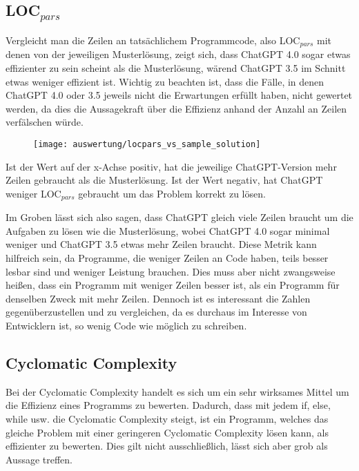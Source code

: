\documentclass[class=scrbook, crop=false]{standalone}
\begin{document}
    \subsection{LOC$_{pars}$}
    Vergleicht man die Zeilen an tatsächlichem Programmcode, also LOC$_{pars}$ mit denen von der jeweiligen Musterlösung,
    zeigt sich, dass ChatGPT 4.0 sogar etwas effizienter zu sein scheint als die Musterlösung, wärend ChatGPT 3.5 im Schnitt etwas weniger effizient ist.
    Wichtig zu beachten ist, dass die Fälle, in denen ChatGPT 4.0 oder 3.5 jeweils nicht die Erwartungen erfüllt haben, nicht
    gewertet werden, da dies die Aussagekraft über die Effizienz anhand der Anzahl an Zeilen verfälschen würde.
    \begin{figure}[H]
        \centering
        \texttt{[image: auswertung/locpars\_vs\_sample\_solution]}
        \caption{}
        \label{fig:3}
    \end{figure}
    Ist der Wert auf der x-Achse positiv, hat die jeweilige ChatGPT-Version mehr Zeilen gebraucht als die Musterlösung.
    Ist der Wert negativ, hat ChatGPT weniger LOC$_{pars}$ gebraucht um das Problem korrekt zu lösen.

    Im Groben lässt sich also sagen, dass ChatGPT gleich viele Zeilen braucht um die Aufgaben zu lösen wie die Musterlösung, wobei ChatGPT 4.0 sogar
    minimal weniger und ChatGPT 3.5 etwas mehr Zeilen braucht.
    Diese Metrik kann hilfreich sein, da Programme, die weniger Zeilen an Code haben, teils besser lesbar sind und weniger
    Leistung brauchen.
    Dies muss aber nicht zwangsweise heißen, dass ein Programm mit weniger Zeilen besser ist, als ein
    Programm für denselben Zweck mit mehr Zeilen.
    Dennoch ist es interessant die Zahlen gegenüberzustellen und zu vergleichen, da es durchaus im Interesse von Entwicklern ist,
    so wenig Code wie möglich zu schreiben.

    \subsection{Cyclomatic Complexity}
    Bei der Cyclomatic Complexity handelt es sich um ein sehr wirksames Mittel um die Effizienz eines Programms zu bewerten.
    Dadurch, dass mit jedem if, else, while usw. die Cyclomatic Complexity steigt, ist ein Programm, welches das gleiche
    Problem mit einer geringeren Cyclomatic Complexity lösen kann, als effizienter zu bewerten.
    Dies gilt nicht ausschließlich, lässt sich aber grob als Aussage treffen.
\end{document}
